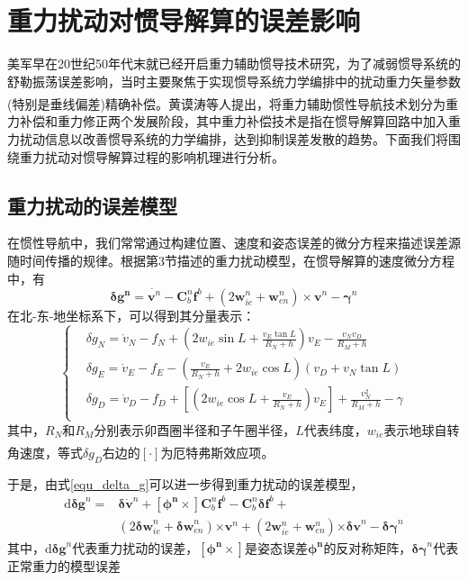 \documentclass[12pt,a4,utf8]{article}
\newcommand{\upcite}[1]{\textsuperscript{\textsuperscript{\cite{#1}}}} %
\begin{document}
\section{重力扰动对惯导解算的误差影响}
美军早在20世纪50年代末就已经开启重力辅助惯导技术研究，为了减弱惯导系统的舒勒振荡误差影响，当时主要聚焦于实现惯导系统力学编排中的扰动重力矢量参数(特别是垂线偏差)精确补偿。黄谟涛等人提出\upcite{WHCH20240724001}，将重力辅助惯性导航技术划分为重力补偿和重力修正两个发展阶段，其中重力补偿技术是指在惯导解算回路中加入重力扰动信息以改善惯导系统的力学编排，达到抑制误差发散的趋势。下面我们将围绕重力扰动对惯导解算过程的影响机理进行分析。

\subsection{重力扰动的误差模型}
在惯性导航中，我们常常通过构建位置、速度和姿态误差的微分方程来描述误差源随时间传播的规律。根据第3节描述的重力扰动模型，在惯导解算的速度微分方程中，有
\begin{equation}
      \bm{\delta g^n} = \dot{\bm{v}^n}-\bm{C}^n_b\bm{f}^b+(2\bm{w}^n_{ie}+\bm{w}^n_{en})\times \bm{v}^n- \bm{\gamma}^n
      \label{equ_delta_g}
\end{equation}
在北-东-地坐标系下，可以得到其分量表示：
\begin{equation}
      \left\{ \begin{aligned}
      & \delta {{g}_{N}}={{{\dot{v}}}_{N}}-{{f}_{N}}+(2{{w}_{ie}}\sin L+\frac{{{v}_{E}}\tan L}{{{R}_{N}}+h}){{v}_{E}}-\frac{{{v}_{N}}{{v}_{D}}}{{{R}_{M}}+h} \\ 
      & \delta {{g}_{E}}={{{\dot{v}}}_{E}}-{{f}_{E}}-(\frac{{{v}_{E}}}{{{R}_{N}}+h}+2{{w}_{ie}}\cos L)({{v}_{D}}+{{v}_{N}}\tan L) \\ 
      & \delta {{g}_{D}}={{{\dot{v}}}_{D}}-{{f}_{D}}+\left[(2{{w}_{ie}}\cos L+\frac{{{v}_{E}}}{{{R}_{N}}+h}){{v}_{E}} \right]+\frac{v_{N}^{2}}{{{R}_{M}}+h}-\gamma  \\ 
\end{aligned} \right.
\label{equ_delta_g_more}
\end{equation}
其中，$R_N$和$R_M$分别表示卯酉圈半径和子午圈半径，$L$代表纬度，$w_{ie}$表示地球自转角速度，等式$\delta g_D$右边的$\left[ \cdot  \right]$为厄特弗斯效应项\upcite{harlan1968eotvos}。

于是，由式\ref{equ_delta_g}可以进一步得到重力扰动的误差模型，
\begin{equation}
      \begin{aligned}
      \text{d}\bm{\delta g}^n = &\bm{\delta} \dot{\bm{v}}^n + \bm{[\phi^n\times]}\bm{C}^n_b \bm{f}^b - \bm{C}^n_b \bm{\delta f}^b + 
      \\
      &(2\bm{\delta w}^n_{ie} +\bm{\delta w}^n_{en})\bm{\times v}^n+(2\bm{w}^n_{ie} + \bm{w}^n_{en})\bm{\times \delta v}^n - \bm{\delta \gamma}^n
      \end{aligned}
      \label{equ_diff_disturb}
\end{equation}
其中，$\text{d}\bm{\delta g}^n$代表重力扰动的误差，$\bm{[\phi^n \times]}$是姿态误差$\bm{\phi^n}$的反对称矩阵，$\bm{\delta \gamma}^n$代表正常重力的模型误差
\end{document}
